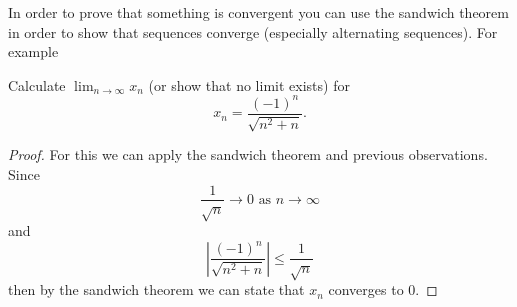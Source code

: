 \documentclass[10pt, a4paper]{article}
\newcommand{\limas}[3][n]{#2 \rightarrow #3 \text{ as } #1 \rightarrow \infty}
\begin{document}
In order to prove that something is convergent you can use the sandwich theorem in order to show that sequences converge (especially alternating sequences). For example
\begin{example}
    Calculate $\lim_{n \rightarrow \infty} x_n$ (or show that no limit exists) for 
    \[
    x_n = \frac{(-1) ^ n}{\sqrt{n ^ 2 + n}}.
    \]
    \begin{proof}
        For this we can apply the sandwich theorem and previous observations. \\
        Since 
        \[
        \limas{\frac{1}{\sqrt{n}}}{0}
        \]
        and
        \[
        \left|\frac{(-1) ^ n}{\sqrt{n ^ 2 + n}}\right| \leq \frac{1}{\sqrt{n}}
        \]
        then by the sandwich theorem we can state that $x_n$ converges to $0$.
    \end{proof}
\end{example}
\end{document}
